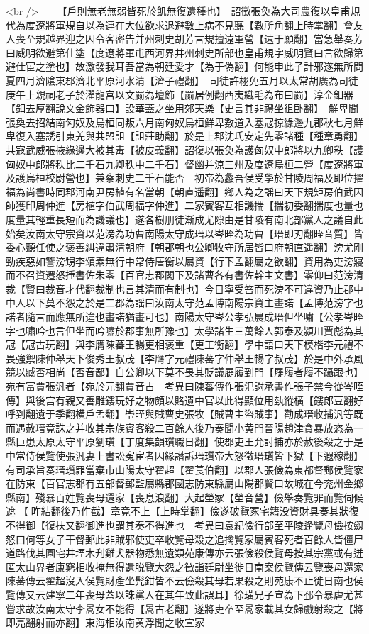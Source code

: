 <br />
　　【戶則無老無弱皆死於飢無復遺種也】　詔徵張奐為大司農復以皇甫規代為度遼將軍規自以為連在大位欲求退避數上病不見聽【數所角翻上時掌翻】會友人喪至規越界迎之因令客密告并州刺史胡芳言規擅遠軍營【遠于願翻】當急舉奏芳曰威明欲避第仕塗【度遼將軍屯西河界并州刺史所部也皇甫規字威明賢曰言欲歸第避仕宦之塗也】故激發我耳吾當為朝廷愛才【為于偽翻】何能申此子計邪遂無所問　夏四月濟隂東郡濟北平原河水清【濟子禮翻】　司徒許栩免五月以太常胡廣為司徒庚午上親祠老子於濯龍宫以文罽為壇飾【罽居例翻西夷織毛為布曰罽】淳金釦器【釦去厚翻說文金飾器口】設華蓋之坐用郊天樂【史言其非禮坐徂卧翻】　鮮卑聞張奐去招結南匈奴及烏桓同叛六月南匈奴烏桓鮮卑數道入塞寇掠緣邊九郡秋七月鮮卑復入塞誘引東羌與共盟詛【詛莊助翻】於是上郡沈氐安定先零諸種【種章勇翻】共寇武威張掖緣邊大被其毒【被皮義翻】詔復以張奐為護匈奴中郎將以九卿秩【護匈奴中郎將秩比二千石九卿秩中二千石】督幽并涼三州及度遼烏桓二營【度遼將軍及護烏桓校尉營也】兼察刺史二千石能否　初帝為蠡吾侯受學於甘陵周福及即位擢福為尚書時同郡河南尹房植有名當朝【朝直遥翻】鄉人為之謡曰天下規矩房伯武因師獲印周仲進【房植字伯武周福字仲進】二家賓客互相譏揣【揣初委翻揣度也量也度量其輕重長短而為譏議也】遂各樹朋徒漸成尤隙由是甘陵有南北部黨人之議自此始矣汝南太守宗資以范滂為功曹南陽太守成瑨以岑晊為功曹【瑨即刃翻晊音質】皆委心聽任使之褒善糾違肅清朝府【朝郡朝也公卿牧守所居皆曰府朝直遥翻】滂尤剛勁疾惡如讐滂甥李頌素無行中常侍唐衡以屬資【行下孟翻屬之欲翻】資用為吏滂寢而不召資遷怒捶書佐朱零【百官志郡閣下及諸曹各有書佐幹主文書】零仰曰范滂清裁【賢曰裁音才代翻裁制也言其清而有制也】今日寧受笞而死滂不可違資乃止郡中中人以下莫不怨之於是二郡為謡曰汝南太守范孟博南陽宗資主畫諾【孟博范滂字也諾者隨言而應無所違也畫諾猶畫可也】南陽太守岑公孝弘農成瑨但坐嘯【公孝岑晊字也嘯吟也言但坐而吟嘯於郡事無所豫也】太學諸生三萬餘人郭泰及潁川賈彪為其冠【冠古玩翻】與李膺陳蕃王暢更相褒重【更工衡翻】學中語曰天下模楷李元禮不畏強禦陳仲舉天下俊秀王叔茂【李膺字元禮陳蕃字仲舉王暢字叔茂】於是中外承風競以臧否相尚【否音鄙】自公卿以下莫不畏其貶議屣履到門【屣履者履不躡跟也】宛有富賈張汎者【宛於元翻賈音古　考異曰陳蕃傳作張汜謝承書作張子禁今從岑晊傳】與後宫有親又善雕鏤玩好之物頗以賂遺中官以此得顯位用埶縱横【鏤郎豆翻好呼到翻遺于季翻横戶孟翻】岺晊與賊曹史張牧【賊曹主盜賊事】勸成瑨收捕汎等既而遇赦瑨竟誅之并收其宗族賓客殺二百餘人後乃奏聞小黄門晉陽趙津貪暴放恣為一縣巨患太原太守平原劉瓆【丁度集韻瓆職日翻】使郡吏王允討捕亦於赦後殺之于是中常侍侯覽使張汎妻上書訟寃宦者因緣譖訴瑨瓆帝大怒徵瑨瓆皆下獄【下遐稼翻】有司承旨奏瑨瓆罪當棄市山陽太守翟超【翟萇伯翻】以郡人張儉為東都督郵侯覽家在防東【百官志郡有五部督郵監屬縣郡國志防東縣屬山陽郡賢曰故城在今兖州金鄉縣南】殘暴百姓覽喪母還家【喪息浪翻】大起塋冢【塋音營】儉舉奏覽罪而覽伺候遮【昨結翻後乃作截】章竟不上【上時掌翻】儉遂破覽冢宅籍没資財具奏其狀復不得御【復扶又翻御進也謂其奏不得進也　考異曰袁紀儉行部至平陵逢覽母儉按劔怒曰何等女子干督郵此非賊邪使吏卒收覽母殺之追擒覽家屬賓客死者百餘人皆僵尸道路伐其園宅井堙木刋雞犬器物悉無遺類苑康傳亦云張儉殺侯覽母按其宗黨或有迸匿太山界者康窮相收掩無得遺脱覽大怨之徵詣廷尉坐徙日南案侯覽傳云覽喪母還家陳蕃傳云翟超沒入侯覽財產坐髠鉗皆不云儉殺其母若果殺之則苑康不止徙日南也侯覽傳又云建寧二年喪母蓋以誅黨人在其年致此誤耳】徐璜兄子宣為下邳令暴虐尤甚嘗求故汝南太守李暠女不能得【暠古老翻】遂將吏卒至暠家載其女歸戲射殺之【將即亮翻射而亦翻】東海相汝南黄浮聞之收宣家